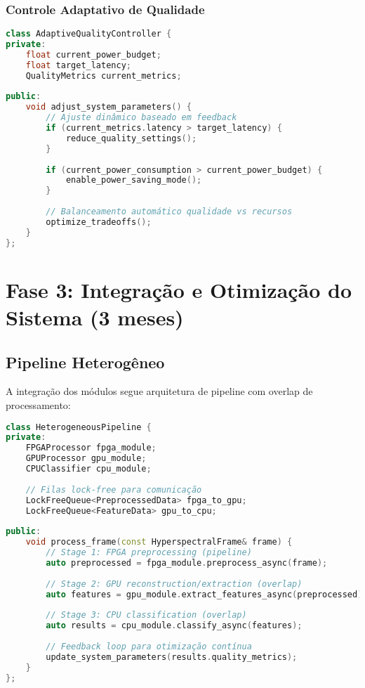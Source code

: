 \subsubsection{Controle Adaptativo de Qualidade}

\begin{lstlisting}[language=cpp, caption=Controle Adaptativo]
class AdaptiveQualityController {
private:
    float current_power_budget;
    float target_latency;
    QualityMetrics current_metrics;
    
public:
    void adjust_system_parameters() {
        // Ajuste dinâmico baseado em feedback
        if (current_metrics.latency > target_latency) {
            reduce_quality_settings();
        }
        
        if (current_power_consumption > current_power_budget) {
            enable_power_saving_mode();
        }
        
        // Balanceamento automático qualidade vs recursos
        optimize_tradeoffs();
    }
};
\end{lstlisting}

\section{Fase 3: Integração e Otimização do Sistema (3 meses)}

\subsection{Pipeline Heterogêneo}

A integração dos módulos segue arquitetura de pipeline com overlap de processamento:

\begin{lstlisting}[language=cpp, caption=Pipeline Heterogêneo]
class HeterogeneousPipeline {
private:
    FPGAProcessor fpga_module;
    GPUProcessor gpu_module;
    CPUClassifier cpu_module;
    
    // Filas lock-free para comunicação
    LockFreeQueue<PreprocessedData> fpga_to_gpu;
    LockFreeQueue<FeatureData> gpu_to_cpu;
    
public:
    void process_frame(const HyperspectralFrame& frame) {
        // Stage 1: FPGA preprocessing (pipeline)
        auto preprocessed = fpga_module.preprocess_async(frame);
        
        // Stage 2: GPU reconstruction/extraction (overlap)
        auto features = gpu_module.extract_features_async(preprocessed);
        
        // Stage 3: CPU classification (overlap)
        auto results = cpu_module.classify_async(features);
        
        // Feedback loop para otimização contínua
        update_system_parameters(results.quality_metrics);
    }
};
\end{lstlisting}

